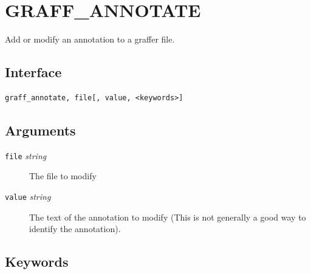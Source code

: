 \documentclass[11pt,twoside,english]{article}
\begin{document}
\section{GRAFF\_ANNOTATE}
\label{sec:graff_annotate}

	Add or modify an annotation to a graffer file.

\subsection{Interface}
\label{sec:ga-inter}

\begin{verbatim}
graff_annotate, file[, value, <keywords>]
\end{verbatim}

\subsection{ Arguments}
\label{sec:ga-args}



\begin{description}
\item[\texttt{file} \textit{string}] The file to modify
\item[\texttt{value} \textit{string}] The text of the
  annotation to modify (This is not generally a good way to identify
  the annotation).
\end{description}

 \subsection{Keywords}
 \label{sec:ga-keys}
\end{document}
